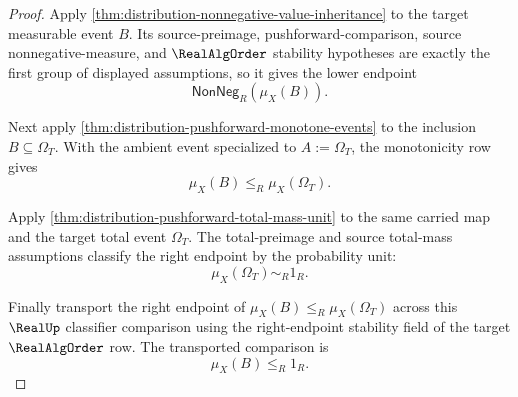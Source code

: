 \begin{proof}
Apply \autoref{thm:distribution-nonnegative-value-inheritance} to the target measurable event $B$. Its source-preimage, pushforward-comparison, source nonnegative-measure, and $\RealAlgOrder$ stability hypotheses are exactly the first group of displayed assumptions, so it gives the lower endpoint
$$
\mathsf{NonNeg}_R(\mu_X(B)).
$$

Next apply \autoref{thm:distribution-pushforward-monotone-events} to the inclusion $B\subseteq\Omega_T$. With the ambient event specialized to $A:=\Omega_T$, the monotonicity row gives
$$
\mu_X(B)\le_R\mu_X(\Omega_T).
$$

Apply \autoref{thm:distribution-pushforward-total-mass-unit} to the same carried map and the target total event $\Omega_T$. The total-preimage and source total-mass assumptions classify the right endpoint by the probability unit:
$$
\mu_X(\Omega_T)\sim_R1_R.
$$

Finally transport the right endpoint of $\mu_X(B)\le_R\mu_X(\Omega_T)$ across this $\RealUp$ classifier comparison using the right-endpoint stability field of the target $\RealAlgOrder$ row. The transported comparison is
$$
\mu_X(B)\le_R1_R.
$$
\end{proof}


